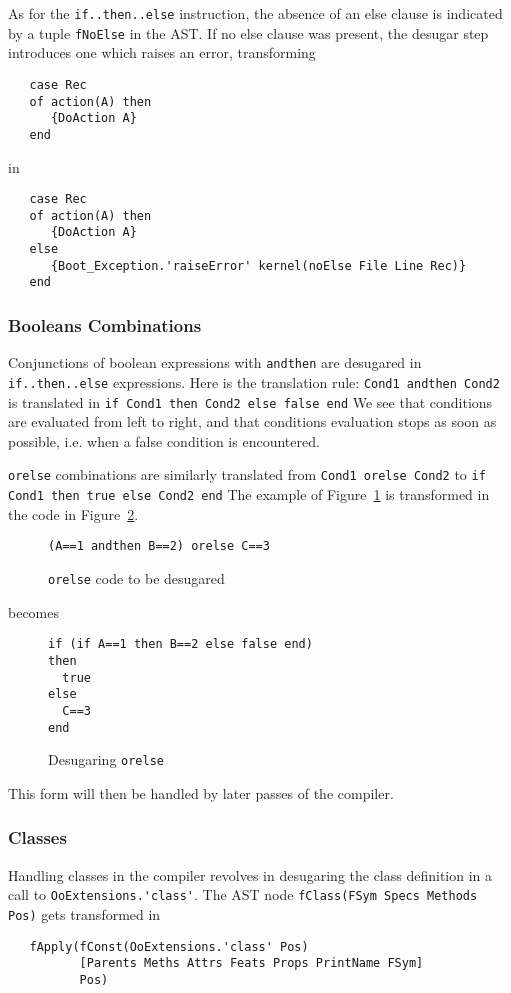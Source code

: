 \documentclass[a4paper]{memoir}
\begin{document}
\pagebreak[4]
As for the \lstinline!if..then..else! instruction, the absence of an else clause
is indicated by a tuple \lstinline!fNoElse! in the AST. If no else clause was
present, the desugar step introduces one which raises an error, transforming

\nopagebreak[4]
\begin{lstlisting}
   case Rec
   of action(A) then
      {DoAction A}
   end
\end{lstlisting}
in
\begin{lstlisting}
   case Rec
   of action(A) then
      {DoAction A}
   else
      {Boot_Exception.'raiseError' kernel(noElse File Line Rec)}
   end
\end{lstlisting}

\subsubsection{Booleans Combinations}
Conjunctions of boolean expressions with \lstinline!andthen! are desugared in
\lstinline!if..then..else! expressions. Here is the translation
rule:
\lstinline!Cond1 andthen Cond2! is translated in \lstinline!if Cond1 then Cond2 else false end! 
We see that conditions are evaluated from left to right, and that conditions
evaluation stops as soon as possible, i.e. when a false condition is
encountered.

\lstinline!orelse! combinations are similarly translated from \lstinline!Cond1 orelse Cond2! to \lstinline!if Cond1 then true else Cond2 end!  
The example of Figure~\ref{fig:desugar:orelsesrc} is transformed in the code in
Figure~\ref{fig:desugar:orelse}.
\begin{figure}[h]
\begin{lstlisting}
(A==1 andthen B==2) orelse C==3
\end{lstlisting}
\caption{\lstinline!orelse! code to be desugared}
\label{fig:desugar:orelsesrc}
\end{figure}

becomes

\begin{figure}[h]
\begin{lstlisting}
if (if A==1 then B==2 else false end)
then
  true
else
  C==3
end
\end{lstlisting}
\caption{Desugaring \lstinline!orelse!}
\label{fig:desugar:orelse}
\end{figure}


This form will then be handled by later passes of the compiler.
\subsubsection{Classes}\label{sec:arch:desugar:classes}
Handling classes in the
compiler revolves in desugaring the class definition in a call to
\lstinline!OoExtensions.'class'!. 
The AST node \lstinline!fClass(FSym Specs Methods Pos)! gets transformed in 
\begin{lstlisting}
   fApply(fConst(OoExtensions.'class' Pos) 
          [Parents Meths Attrs Feats Props PrintName FSym] 
          Pos)
\end{lstlisting}
\end{document}
